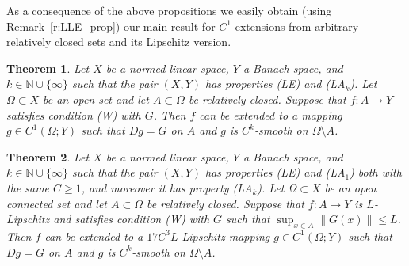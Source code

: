 \documentclass[a4paper,twoside,10pt,reqno,draft]{amsart}
\newtheorem{theorem}{Theorem}
\theoremstyle{definition}
\theoremstyle{remark}
\newcommand\norm[1]{\mathopen\|#1\mathclose\|}
\newcommand\Om{\Omega}
\newcommand\N{{\mathbb N}}
\newcommand\pLA[1]{(LA$_#1$)}
\newcommand\pLE{(LE)}
\newcommand\cW{(W)}
\begin{document}
As a consequence of the above propositions we easily obtain (using Remark~\ref{r:LLE_prop}) our main result for $C^1$ extensions from arbitrary relatively closed sets and its Lipschitz version.
\begin{theorem}\label{t:Ck_outside}
Let $X$ be a normed linear space, $Y$ a Banach space, and $k\in\N\cup\{\infty\}$ such that the pair $(X,Y)$ has properties {\pLE} and \pLA k.
Let $\Om\subset X$ be an open set and let $A\subset\Om$ be relatively closed.
Suppose that $f\colon A\to Y$ satisfies condition {\cW} with $G$.
Then $f$ can be extended to a mapping $g\in C^1(\Om;Y)$ such that $Dg=G$ on $A$ and $g$ is $C^k$-smooth on $\Om\setminus A$.
\end{theorem}

\begin{theorem}\label{t:Ck_outside-Lip}
Let $X$ be a normed linear space, $Y$ a Banach space, and $k\in\N\cup\{\infty\}$ such that the pair $(X,Y)$ has properties {\pLE} and \pLA 1 both with the same $C\ge1$,
and moreover it has property \pLA k.
Let $\Om\subset X$ be an open connected set and let $A\subset\Om$ be relatively closed.
Suppose that $f\colon A\to Y$ is $L$-Lipschitz and satisfies condition {\cW} with $G$ such that $\sup_{x\in A}\norm{G(x)}\le L$.
Then $f$ can be extended to a $17C^3L$-Lipschitz mapping $g\in C^1(\Om;Y)$ such that $Dg=G$ on $A$ and $g$ is $C^k$-smooth on $\Om\setminus A$.
\end{theorem}
\end{document}
